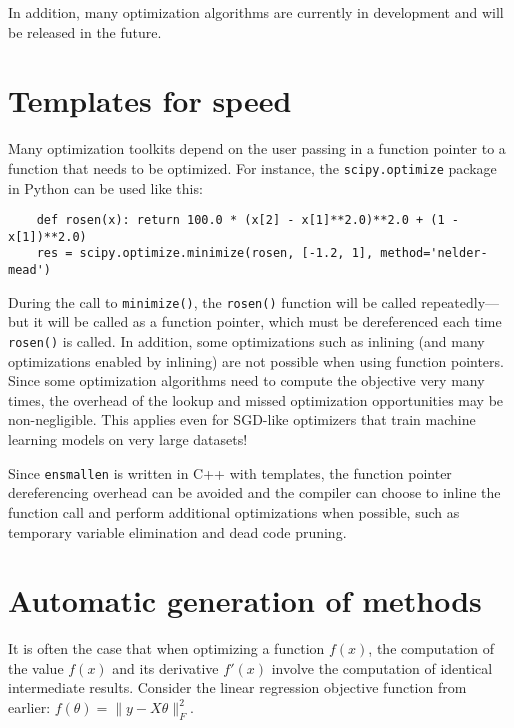 \documentclass{article}
\begin{document}
In addition, many optimization algorithms are currently in development and will
be released in the future.

\vspace*{-0.3em}
\section{Templates for speed}
\vspace*{-0.5em}

Many optimization toolkits depend on the user passing in a function pointer to a
function that needs to be optimized.  For instance, the {\tt scipy.optimize}
package in Python can be used like this:

\vspace*{-0.3em}
\begin{verbatim}
    def rosen(x): return 100.0 * (x[2] - x[1]**2.0)**2.0 + (1 - x[1])**2.0)
    res = scipy.optimize.minimize(rosen, [-1.2, 1], method='nelder-mead')
\end{verbatim}
\vspace*{-0.3em}

During the call to {\tt minimize()}, the {\tt rosen()} function will be called
repeatedly---but it will be called as a function pointer, which must be
dereferenced each time {\tt rosen()} is called.  In addition, some
optimizations such as inlining (and many optimizations enabled by inlining) are
not possible when using function pointers.  Since some optimization algorithms
need to compute the objective very many times, the overhead of the lookup and
missed optimization opportunities may be non-negligible.  This applies even for
SGD-like optimizers that train machine learning models on very large datasets!

Since {\tt ensmallen} is written in C++ with templates, the function pointer
dereferencing overhead can be avoided and the compiler can choose to inline the
function call and perform additional optimizations when possible, such as
temporary variable elimination and dead code pruning.

\vspace*{-0.3em}
\section{Automatic generation of methods}
\vspace*{-0.5em}

It is often the case that when optimizing a function $f(x)$, the computation of
the value $f(x)$ and its derivative $f'(x)$ involve the computation of identical
intermediate results.  Consider the linear regression objective function from
earlier:
$f(\theta) = \| y - X\theta \|_F^2.$
\end{document}
